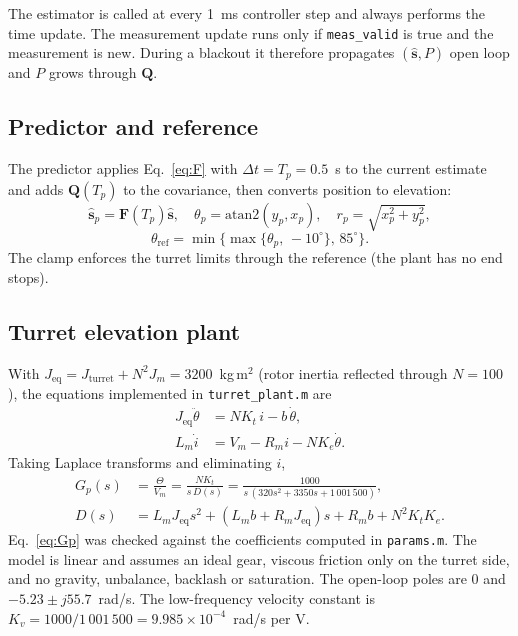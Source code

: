 \documentclass[conference]{IEEEtran}
\newcommand{\Tp}{T_p}
\newcommand{\Kv}{K_v}
\newcommand{\vect}[1]{\mathbf{#1}}
\begin{document}
The estimator is called at every 1~ms controller step and always performs the time update. The measurement update runs only if \texttt{meas\_valid} is true and the measurement is new. During a blackout it therefore propagates $(\hat{\vect s},P)$ open loop and $P$ grows through $\vect Q$.

\subsection{Predictor and reference}

The predictor applies Eq.~\eqref{eq:F} with $\Delta t=\Tp=0.5$~s to the current estimate and adds $\vect Q(\Tp)$ to the covariance, then converts position to elevation:
\begin{equation}
\hat{\vect s}_p=\vect F(\Tp)\hat{\vect s},\quad
\theta_p=\mathrm{atan2}(y_p,x_p),\quad r_p=\sqrt{x_p^2+y_p^2},
\end{equation}
\begin{equation}
\theta_\mathrm{ref}=\min\{\max\{\theta_p,\,-10^\circ\},\,85^\circ\}.
\end{equation}
The clamp enforces the turret limits through the reference (the plant has no end stops).

\subsection{Turret elevation plant}

With $J_\mathrm{eq}=J_\mathrm{turret}+N^2J_m=3200$~kg\,m$^2$ (rotor inertia reflected through $N=100$), the equations implemented in \texttt{turret\_plant.m} are
\begin{align}
J_\mathrm{eq}\ddot\theta&=NK_t\,i-b\,\dot\theta,\\
L_m\dot i&=V_m-R_m i-NK_e\dot\theta.
\end{align}
Taking Laplace transforms and eliminating $i$,
\begin{align}
G_p(s)&=\frac{\Theta}{V_m}=\frac{NK_t}{s\,D(s)}=\frac{1000}{s\,(320s^2+3350s+1\,001\,500)},\label{eq:Gp}\\
D(s)&=L_mJ_\mathrm{eq}s^2+(L_mb+R_mJ_\mathrm{eq})s+R_mb+N^2K_tK_e.\nonumber
\end{align}
Eq.~\eqref{eq:Gp} was checked against the coefficients computed in \texttt{params.m}. The model is linear and assumes an ideal gear, viscous friction only on the turret side, and no gravity, unbalance, backlash or saturation. The open-loop poles are $0$ and $-5.23\pm j55.7$~rad/s. The low-frequency velocity constant is $\Kv=1000/1\,001\,500=9.985\times10^{-4}$~rad/s per V.
\end{document}
